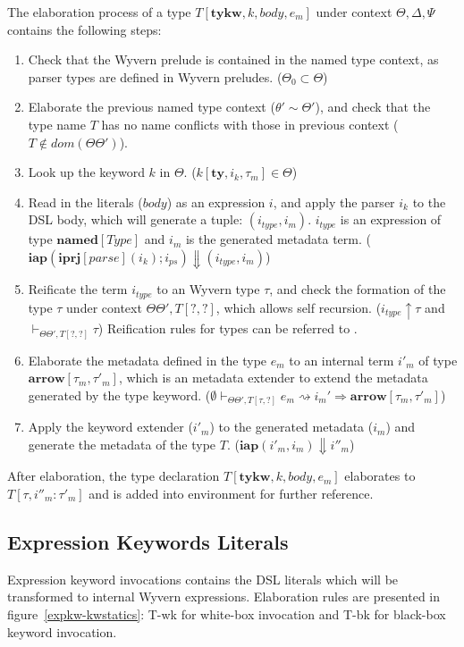\documentclass{sig-alternate}
\begin{document}
The elaboration process of a type $T[\mathbf{tykw},k,body,e_m]$ under context $\Theta,\Delta,\Psi$ contains the following steps:
\begin{enumerate}\setlength{\itemsep}{0pt}
\item Check that the Wyvern prelude is contained in the named type context, as parser types are defined in Wyvern preludes. ($\Theta_0\subset \Theta$)
\item Elaborate the previous named type context ($\theta'\sim\Theta'$), and check that the type name $T$ has no name conflicts with those in previous context ($T\notin dom(\Theta\Theta')$).
\item Look up the keyword $k$ in $\Theta$. ($k[\mathbf{ty},i_k,\tau_m]\in\Theta$)
\item Read in the literals ($body$) as an expression $i$, and apply the parser $i_k$ to the DSL body, which will generate a tuple: $(i_{type}, i_m)$. $i_{type}$ is an expression of type $\mathbf{named}[Type]$ and $i_m$ is the generated metadata term. ($\mathbf{iap}(\mathbf{iprj}[parse](i_k);i_{ps})\Downarrow(i_{type},i_{m})$)
\item Reificate the term $i_{type}$ to an Wyvern type $\tau$, and check the formation of the type $\tau$ under context $\Theta\Theta',T[?,?]$, which allows self recursion. ($i_{type}\uparrow\tau$ and $\vdash_{\Theta\Theta',T[?,?]}\tau$) Reification rules for types can be referred to .
\item Elaborate the metadata defined in the type $e_m$ to an internal term $i'_m$ of type $\mathbf{arrow}[\tau_m,\tau'_m]$, which is an metadata extender to extend the metadata generated by the type keyword. ($\emptyset\vdash_{\Theta\Theta',T[\tau,?]}e_m\rightsquigarrow i_m' \Rightarrow \mathbf{arrow}[\tau_m, \tau'_m]$)
\item Apply the keyword extender ($i'_m$) to the generated metadata ($i_m$) and generate the metadata of the type $T$. ($\mathbf{iap}(i'_m,i_m)\Downarrow i''_m$)  
\end{enumerate}
After elaboration, the type declaration $T[\mathbf{tykw},k,body,e_m]$ elaborates to $T[\tau,i''_m:\tau'_m]$ and is added into environment for further reference.



\subsection{Expression Keywords Literals}
Expression keyword invocations contains the DSL literals which will be transformed to internal Wyvern expressions. Elaboration rules are presented in figure~\ref{expkw-kwstatics}: T-wk for white-box invocation and T-bk for black-box keyword invocation.
\end{document}
